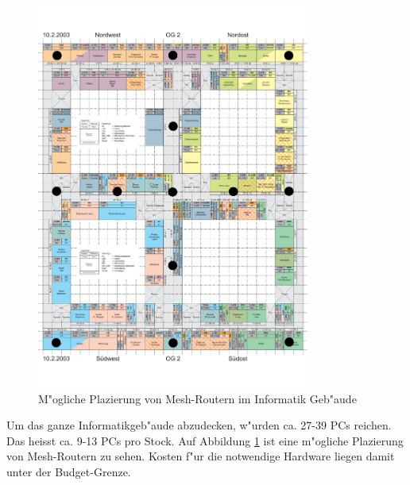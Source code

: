 \begin{figure}[H]
\centering
\includegraphics[width=0.8\textwidth]{images/plan.pdf}
\caption{M"ogliche Plazierung von Mesh-Routern im Informatik Geb"aude}
\label{fig:plan}
\end{figure}
	
Um das ganze Informatikgeb"aude abzudecken, w"urden ca. 27-39 PCs reichen.
Das heisst ca. 9-13 PCs pro Stock.  Auf Abbildung \ref{fig:plan} ist
eine m"ogliche Plazierung von Mesh-Routern zu sehen.  Kosten f"ur die
notwendige Hardware liegen damit unter der Budget-Grenze.
